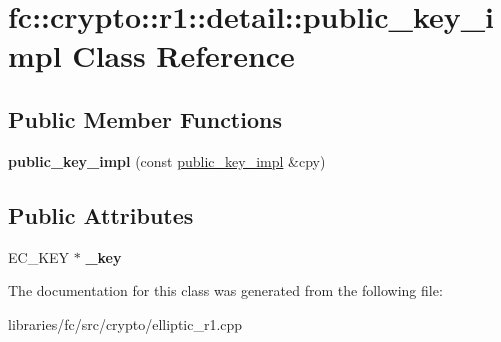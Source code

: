 \hypertarget{classfc_1_1crypto_1_1r1_1_1detail_1_1public__key__impl}{}\section{fc\+:\+:crypto\+:\+:r1\+:\+:detail\+:\+:public\+\_\+key\+\_\+impl Class Reference}
\label{classfc_1_1crypto_1_1r1_1_1detail_1_1public__key__impl}
\subsection*{Public Member Functions}
\begin{DoxyCompactItemize}
\item 
\mbox{\label{classfc_1_1crypto_1_1r1_1_1detail_1_1public__key__impl_a4f20c159cebb98ca3733aee6b9e9fe8d}} 
{\bfseries public\+\_\+key\+\_\+impl} (const \mbox{\hyperlink{classfc_1_1crypto_1_1r1_1_1detail_1_1public__key__impl}{public\+\_\+key\+\_\+impl}} \&cpy)
\end{DoxyCompactItemize}
\subsection*{Public Attributes}
\begin{DoxyCompactItemize}
\item 
\mbox{\label{classfc_1_1crypto_1_1r1_1_1detail_1_1public__key__impl_a97d0cbcf8df7c9fadc942f20b9cde3ba}} 
E\+C\+\_\+\+K\+EY $\ast$ {\bfseries \+\_\+key}
\end{DoxyCompactItemize}


The documentation for this class was generated from the following file\+:\begin{DoxyCompactItemize}
\item 
libraries/fc/src/crypto/elliptic\+\_\+r1.\+cpp\end{DoxyCompactItemize}
